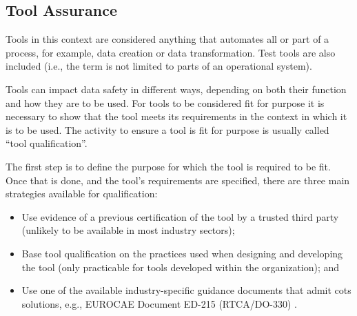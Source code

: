 \subsection{Tool Assurance}
Tools in this context are considered anything that automates all or part of a process, for example, data creation or data transformation. Test tools are also included (i.e., the term is not limited to parts of an operational system).

Tools can impact data safety in different ways, depending on both their function and how they are to be used. For tools to be considered fit for purpose it is necessary to show that the tool meets its requirements in the context in which it is to be used. The activity to ensure a tool is fit for purpose is usually called ``tool qualification''.

The first step is to define the purpose for which the tool is required to be fit. Once that is done, and the tool's requirements are specified, there are three main strategies available for qualification:
\begin{itemize}
  \item Use evidence of a previous certification of the tool by a trusted third party (unlikely to be available in most industry sectors);
  \item Base tool qualification on the practices used when designing and developing the tool (only practicable for tools developed within the organization); and
  \item Use one of the available industry-specific guidance documents that admit \gls{cots} solutions, e.g., EUROCAE Document ED-215 (RTCA/DO-330) \cite{citation:ED215}.
\end{itemize}


